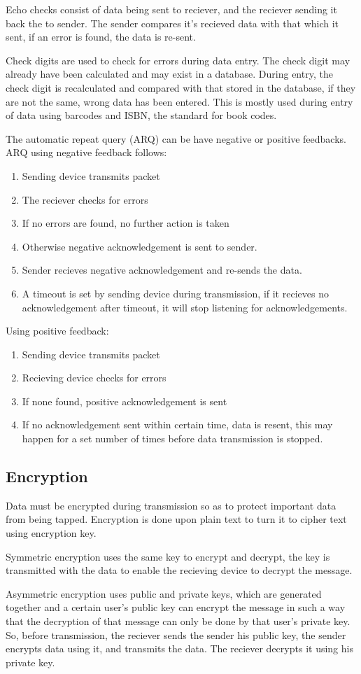 Echo checks consist of data being sent to reciever, and the reciever sending it back the to sender.
The sender compares it's recieved data with that which it sent, if an error is found, the data is
re-sent.

Check digits are used to check for errors during data entry. The check digit may already have been
calculated and may exist in a database. During entry, the check digit is recalculated and compared
with that stored in the database, if they are not the same, wrong data has been entered. This is
mostly used during entry of data using barcodes and ISBN, the standard for book codes.

The automatic repeat query (ARQ) can be have negative or positive feedbacks. ARQ using negative
feedback follows:
\begin{enumerate}
	\item Sending device transmits packet
	\item The reciever checks for errors
	\item If no errors are found, no further action is taken
	\item Otherwise negative acknowledgement is sent to sender.
	\item Sender recieves negative acknowledgement and re-sends the data.
	\item A timeout is set by sending device during transmission, if it recieves no acknowledgement
		after timeout, it will stop listening for acknowledgements.
\end{enumerate}

Using positive feedback:
\begin{enumerate}
	\item Sending device transmits packet
	\item Recieving device checks for errors
	\item If none found, positive acknowledgement is sent
	\item If no acknowledgement sent within certain time, data is resent, this may happen for a set
		number of times before data transmission is stopped.
\end{enumerate}

\subsection{Encryption}
Data must be encrypted during transmission so as to protect important data from being tapped.
Encryption is done upon plain text to turn it to cipher text using encryption key. 

Symmetric
encryption uses the same key to encrypt and decrypt, the key is transmitted with the data to
enable the recieving device to decrypt the message. 

Asymmetric encryption uses public and private
keys, which are generated together and a certain user's public key can encrypt the message in
such a way that the decryption of that message can only be done by that user's private key. So,
before transmission, the reciever sends the sender his public key, the sender encrypts data using 
it, and transmits the data. The reciever decrypts it using his private key.
